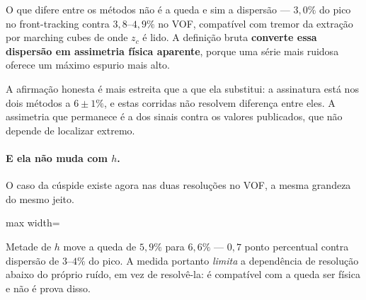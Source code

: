 O que difere entre os m\'etodos n\~ao \'e a queda e sim a dispers\~ao ---
$3{,}0\%$ do pico no front-tracking contra $3{,}8$--$4{,}9\%$ no VOF,
compat\'ivel com tremor da extra\c{c}\~ao por marching cubes de onde $z_c$ \'e
lido. A defini\c{c}\~ao bruta \textbf{converte essa dispers\~ao em assimetria
f\'isica aparente}, porque uma s\'erie mais ruidosa oferece um m\'aximo espurio
mais alto.

A afirma\c{c}\~ao honesta \'e mais estreita que a que ela substitui: a
assinatura est\'a nos dois m\'etodos a $6\pm1\%$, e estas corridas n\~ao
resolvem diferen\c{c}a entre eles. A assimetria que permanece \'e a dos sinais
contra os valores publicados, que n\~ao depende de localizar extremo.

\paragraph{E ela n\~ao muda com $h$.} O caso da c\'uspide existe agora nas duas
resolu\c{c}\~oes no VOF, a mesma grandeza do mesmo jeito.

\begin{table}[htbp]
\centering
\caption{A queda em duas resolu\c{c}\~oes, VOF, $\lambda_1=0{,}4$, $\beta=0{,}2$.}
\label{tab:tridim-queda-res}
\small
\begin{adjustbox}{max width=\linewidth}
\end{adjustbox}
\end{table}

Metade de $h$ move a queda de $5{,}9\%$ para $6{,}6\%$ --- $0{,}7$ ponto
percentual contra dispers\~ao de $3$--$4\%$ do pico. A medida portanto
\emph{limita} a depend\^encia de resolu\c{c}\~ao abaixo do pr\'oprio ru\'ido, em
vez de resolv\^e-la: \'e compat\'ivel com a queda ser f\'isica e n\~ao \'e prova
disso.

